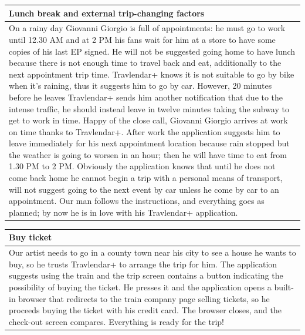%
\begin{center}
\def\arraystretch{1.5}
  \begin{tabular}{ | p{} | }
    \hline
    Lunch break and external trip-changing factors \\ \hline
    On a rainy day Giovanni Giorgio is full of appointments: he must go to work until 12.30 AM and at 2 PM his fans wait for him at a store to have some copies of his last EP signed. He will not be suggested going home to have lunch because there is not enough time to travel back and eat, additionally to the next appointment trip time. Travlendar+ knows it is not suitable to go by bike when it’s raining, thus it suggests him to go by car. However, 20 minutes before he leaves Travlendar+ sends him another notification that due to the intense traffic, he should instead leave in twelve minutes taking the subway to get to work in time. Happy of the close call, Giovanni Giorgio arrives at work on time thanks to Travlendar+. After work the application suggests him to leave immediately for his next appointment location because rain stopped but the weather is going to worsen in an hour; then he will have time to eat from 1.30 PM to 2 PM. Obviously the application knows that until he does not come back home he cannot begin a trip with a personal means of transport, will not suggest going to the next event by car unless he come by car to an appointment. Our man follows the instructions, and everything goes as planned; by now he is in love with his Travlendar+ application.  \\ \hline
  \end{tabular}
\end{center}
%
\begin{center}
\def\arraystretch{1.5}
  \begin{tabular}{ | p{} | }
    \hline
    Buy ticket \\ \hline
    Our artist needs to go in a county town near his city to see a house he wants to buy, so he trusts Travlendar+ to arrange the trip for him. The application suggests using the train and the trip screen contains a button indicating the possibility of buying the ticket. He presses it and the application opens a built-in browser that redirects to the train company page selling tickets, so he proceeds buying the ticket with his credit card. The browser closes, and the check-out screen compares. Everything is ready for the trip! \\ \hline
  \end{tabular}
\end{center}
\pagebreak
%
